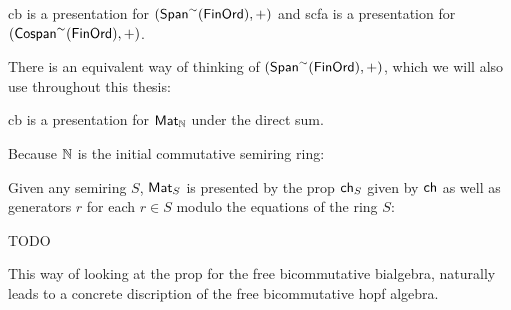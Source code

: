 \begin{lemma} \cite[\S 5.3, 5.4]{lack}
{\sf cb} is a presentation for $(\mathsf{Span}^{\sim}(\mathsf{FinOrd}),+)$ and {\sf scfa} is a presentation for $({\sf Cospan}^\sim(\mathsf{FinOrd}),+)$.

\end{lemma}

There is an equivalent way of thinking of $(\mathsf{Span}^{\sim}(\mathsf{FinOrd}),+)$, which we will also use throughout this thesis:

\begin{lemma}
{\sf cb} is a presentation for $\mathsf{Mat}_{\mathbb{N}}$ under the direct sum.
\end{lemma}


Because $\mathbb{N}$ is the initial commutative semiring ring:
\begin{lemma}
Given any semiring $S$, $\mathsf{Mat}_S$ is presented by the prop ${\sf ch}_S$ given by ${\sf ch}$ as well as generators $r$ for each $r \in S$ modulo the equations of the ring $S$:

TODO
\end{lemma}
This way of looking at the prop for the free bicommutative bialgebra, naturally leads to a concrete discription of the free bicommutative hopf algebra.

